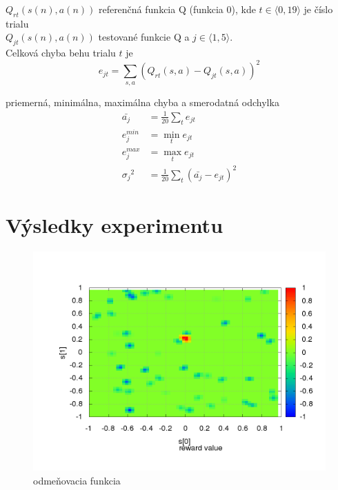 $Q_{rt}(s(n),a(n))$ referenčná funkcia Q (funkcia 0), kde $t \in \langle 0, 19 \rangle $ je číslo trialu  \\
$Q_{jt}(s(n),a(n))$ testované funkcie Q a $j \in \langle 1, 5 \rangle $. \\

Celková chyba behu trialu $t$ je \\
\begin{equation}
e_{jt} = \sum\limits_{s, a}{(Q_{rt}(s,a) - Q_{jt}(s,a))^2}  \nonumber
\end{equation}

priemerná, minimálna, maximálna chyba a smerodatná odchylka \\
\begin{align}
\bar{a_j} &= \frac{1}{20}\sum\limits_{t}{e_{jt}}  \nonumber \\
{e^{min}_j} &= \min_{t}{e_{jt}}  \nonumber \\
{e^{max}_j} &= \max_{t}{e_{jt}}  \nonumber \\
{\sigma_j}^2 &= \frac{1}{20}\sum\limits_{t}{(\bar{a_j} - e_{jt})^2}  \nonumber
\end{align}

\section {Výsledky experimentu}



\begin{figure}[!htb]
\centering
\includegraphics[scale=.4]{../../results_q_learning/map_1/reward_value_surface.png}
\caption{odmeňovacia funkcia}
\end{figure}




